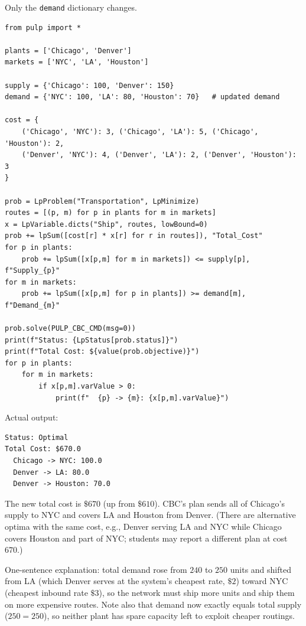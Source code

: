 
Only the \texttt{demand} dictionary changes.

\begin{verbatim}
from pulp import *

plants = ['Chicago', 'Denver']
markets = ['NYC', 'LA', 'Houston']

supply = {'Chicago': 100, 'Denver': 150}
demand = {'NYC': 100, 'LA': 80, 'Houston': 70}   # updated demand

cost = {
    ('Chicago', 'NYC'): 3, ('Chicago', 'LA'): 5, ('Chicago', 'Houston'): 2,
    ('Denver', 'NYC'): 4, ('Denver', 'LA'): 2, ('Denver', 'Houston'): 3
}

prob = LpProblem("Transportation", LpMinimize)
routes = [(p, m) for p in plants for m in markets]
x = LpVariable.dicts("Ship", routes, lowBound=0)
prob += lpSum([cost[r] * x[r] for r in routes]), "Total_Cost"
for p in plants:
    prob += lpSum([x[p,m] for m in markets]) <= supply[p], f"Supply_{p}"
for m in markets:
    prob += lpSum([x[p,m] for p in plants]) >= demand[m], f"Demand_{m}"

prob.solve(PULP_CBC_CMD(msg=0))
print(f"Status: {LpStatus[prob.status]}")
print(f"Total Cost: ${value(prob.objective)}")
for p in plants:
    for m in markets:
        if x[p,m].varValue > 0:
            print(f"  {p} -> {m}: {x[p,m].varValue}")
\end{verbatim}

Actual output:

\begin{verbatim}
Status: Optimal
Total Cost: $670.0
  Chicago -> NYC: 100.0
  Denver -> LA: 80.0
  Denver -> Houston: 70.0
\end{verbatim}

The new total cost is $\$670$ (up from $\$610$). CBC's plan sends all of
Chicago's supply to NYC and covers LA and Houston from Denver. (There are
alternative optima with the same cost, e.g., Denver serving LA and NYC while
Chicago covers Houston and part of NYC; students may report a different plan
at cost $670$.)

One-sentence explanation: total demand rose from $240$ to $250$ units and
shifted from LA (which Denver serves at the system's cheapest rate, $\$2$)
toward NYC (cheapest inbound rate $\$3$), so the network must ship more units
and ship them on more expensive routes. Note also that demand now exactly
equals total supply ($250 = 250$), so neither plant has spare capacity left to
exploit cheaper routings.

